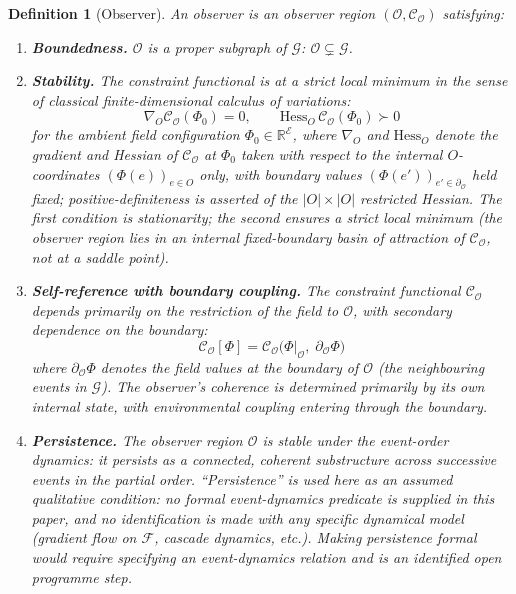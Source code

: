 \documentclass[12pt]{article}
\newtheorem{definition}[theorem]{Definition}
\newcommand{\Ecal}{\mathcal{E}}
\newcommand{\Gcal}{\mathcal{G}}
\newcommand{\Fcal}{\mathcal{F}}
\newcommand{\Ocal}{\mathcal{O}}
\newcommand{\Ccal}{\mathcal{C}}
\begin{document}
\begin{definition}[Observer]\label{def:observer}
An \textit{observer} is an observer region $(\Ocal, \Ccal_\Ocal)$ satisfying:
\begin{enumerate}
    \item \textbf{Boundedness.} $\Ocal$ is a proper subgraph of $\Gcal$: $\Ocal \subsetneq \Gcal$.
    \item \textbf{Stability.} The constraint functional is at a strict local minimum in the sense of classical finite-dimensional calculus of variations:
    \begin{equation}\label{eq:stability}
        \nabla_O \Ccal_\Ocal(\Phi_0) = 0, \qquad \mathrm{Hess}_O\, \Ccal_\Ocal(\Phi_0) \succ 0
    \end{equation}
    for the ambient field configuration $\Phi_0 \in \mathbb{R}^\Ecal$, where $\nabla_O$ and $\mathrm{Hess}_O$ denote the gradient and Hessian of $\Ccal_\Ocal$ at $\Phi_0$ taken with respect to the internal $O$-coordinates $(\Phi(e))_{e \in O}$ only, with boundary values $(\Phi(e'))_{e' \in \partial_\Ocal}$ held fixed; positive-definiteness is asserted of the $|O| \times |O|$ restricted Hessian. The first condition is stationarity; the second ensures a strict local minimum (the observer region lies in an internal fixed-boundary basin of attraction of $\Ccal_\Ocal$, not at a saddle point).
    \item \textbf{Self-reference with boundary coupling.} The constraint functional $\Ccal_\Ocal$ depends primarily on the restriction of the field to $\Ocal$, with secondary dependence on the boundary:
    \begin{equation}\label{eq:selfref}
        \Ccal_\Ocal[\Phi] = \Ccal_\Ocal\!\bigl(\Phi|_\Ocal,\; \partial_\Ocal \Phi\bigr)
    \end{equation}
    where $\partial_\Ocal \Phi$ denotes the field values at the boundary of $\Ocal$ (the neighbouring events in $\Gcal$). The observer's coherence is determined primarily by its own internal state, with environmental coupling entering through the boundary.
    \item \textbf{Persistence.} The observer region $\Ocal$ is stable under the event-order dynamics: it persists as a connected, coherent substructure across successive events in the partial order. ``Persistence'' is used here as an \emph{assumed qualitative condition}: no formal event-dynamics predicate is supplied in this paper, and no identification is made with any specific dynamical model (gradient flow on $\Fcal$, cascade dynamics, etc.). Making persistence formal would require specifying an event-dynamics relation and is an identified open programme step.
\end{enumerate}
\end{definition}
\end{document}
